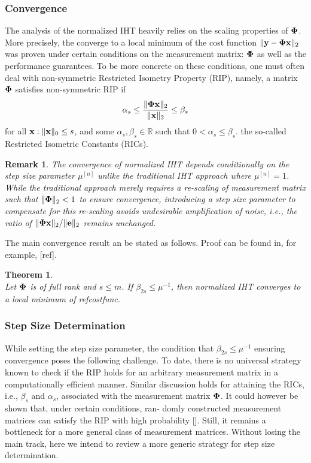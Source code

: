 \documentclass{article}
\newtheorem{theorem}{Theorem}
\newtheorem{remark}{Remark}
\begin{document}
\subsubsection{Convergence} 
The analysis of the normalized IHT heavily relies on the scaling properties of ${\bf \Phi}$. More precisely, the converge to a local minimum of the cost function $\|{\bf y}-{\bf \Phi x} \|_2$ was proven under certain conditions on the measurement matrix: ${\bf \Phi}$ as well as the performance guarantees. To be more concrete on these conditions, one must often deal with non-symmetric Restricted Isometry Property (RIP), namely, a matrix ${\bf \Phi}$ satisfies non-symmetric RIP if
\begin{equation}
\alpha_{s} \leq \frac{\|{\bf \Phi} {\bf x}\|_2}{\|{\bf x}\|_2} \leq \beta_{s}
\end{equation}
for all ${\bf x}: \|{\bf x}\|_0 \leq s$, and some $\alpha_s, \beta_s \in \mathbb{R}$ such that $0<\alpha_s\leq \beta_s$. the so-called Restricted Isometric Constants (RICs).
\begin{remark}
The convergence of normalized IHT depends conditionally on the step size parameter $\mu^{[n]}$ unlike the traditional IHT approach where $\mu^{[n]}=1$. While the traditional approach merely requires a re-scaling of measurement matrix such that $\|{\bf \Phi}\|_2 <1$ to ensure convergence, introducing a step size parameter to compensate for this re-scaling avoids undesirable amplification of noise, i.e., the ratio of $\|{\bf \Phi x}\|_2/\|{\bf e}\|_2$ remains unchanged. 
\end{remark}

The main convergence result an be stated as follows. Proof can be found in, for example, [ref].

\begin{theorem}
{\rm{\cite{niht}}}\\ 
Let ${\bf \Phi}$ is of full rank and $s\leq m$. If $\beta_{2s}\leq\mu^{-1}$, then normalized IHT converges to a local minimum of ref{costfunc}.
\end{theorem}

\subsubsection{Step Size Determination} 
While setting the step size parameter, the condition that $\beta_{2s}\leq\mu^{-1}$ ensuring convergence poses the following challenge. To date, there is no universal strategy known to check if the RIP holds for an arbitrary measurement matrix in a computationally efficient manner. Similar discussion holds for attaining the RICs, i.e., ${\beta_s}$ and $\alpha_s$, associated with the measurement matrix ${\bf \Phi}$. It could however be shown that, under certain conditions, ran-
domly constructed measurement matrices can satisfy
the RIP with high probability []. Still, it remains a bottleneck for a more general class of
measurement matrices. Without losing the main track, here we intend to review a more generic strategy for step size determination.
\end{document}
